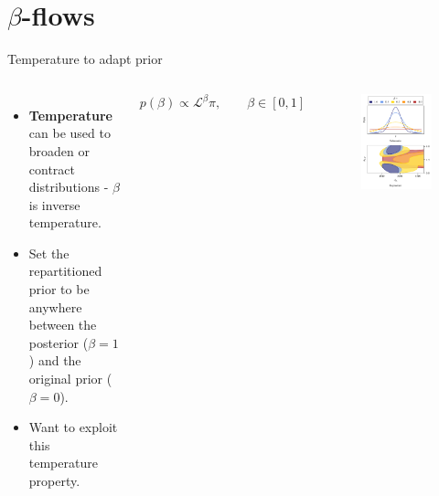 \documentclass[aspectratio=169, 11pt]{beamer}
\begin{document}
\section{$\beta$-flows}

\begin{frame}{Temperature to adapt prior}
\begin{columns}
    \begin{itemize}
        \item \textbf{Temperature} can be used to broaden or contract distributions - $\beta$ is inverse temperature.
        \item Set the repartitioned prior to be anywhere between the posterior ($\beta=1$) and the original prior ($\beta=0$).
        \item Want to exploit this temperature property.
    \end{itemize}\vspace{2em}
    \begin{equation}
        p(\beta) \propto \mathcal{L}^\beta \pi, \hspace{2em} \beta \in [0,1]
    \end{equation}
\begin{figure}
    \centering
    \includegraphics[width=1\textwidth]{Ca_Foscari Beamer/figure3_beta_v2.pdf}
\end{figure}
\end{columns}   
\end{frame}
\end{document}
